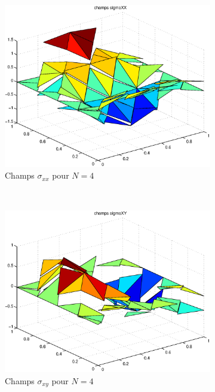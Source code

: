 \begin{figure}[h!]
  \centering
  \begin{subfigure}[b]{0.32\textwidth}
  \includegraphics[width=\textwidth]{images/sigmaxxN4.eps}
  \caption{Champs $\sigma_{xx}$ pour $N=4$}
  \end{subfigure}%
  ~
  \begin{subfigure}[b]{0.32\textwidth}
  \includegraphics[width=\textwidth]{images/sigmaxyN4.eps}
  \caption{Champs $\sigma_{xy}$ pour $N=4$}
  \end{subfigure}
  ~
  \begin{subfigure}[b]{0.32\textwidth}

\end{subfigure}
\end{figure}
